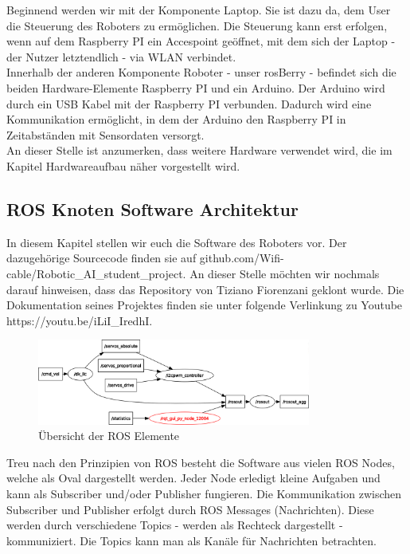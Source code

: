 \documentclass[conference]{IEEEtran}
\begin{document}
	Beginnend werden wir mit der Komponente Laptop. Sie ist dazu da, dem User die Steuerung des Roboters zu ermöglichen. Die Steuerung kann erst erfolgen, wenn auf dem Raspberry PI ein Accespoint geöffnet, mit dem sich der Laptop - der Nutzer letztendlich - via WLAN verbindet.\\
	Innerhalb der anderen Komponente Roboter - unser rosBerry - befindet sich die beiden Hardware-Elemente Raspberry PI und ein Arduino. Der Arduino wird durch ein USB Kabel mit der Raspberry PI verbunden. Dadurch wird eine Kommunikation ermöglicht, in dem der Arduino den Raspberry PI in Zeitabständen mit Sensordaten versorgt.\\
	An dieser Stelle ist anzumerken, dass weitere Hardware verwendet wird, die im Kapitel Hardwareaufbau näher vorgestellt wird.
	
	\subsection{ROS Knoten Software Architektur}%
	In diesem Kapitel stellen wir euch die Software des Roboters vor. Der dazugehörige Sourcecode finden sie auf github.com/Wifi-cable/Robotic\_AI\_student\_project. An dieser Stelle möchten wir nochmals darauf hinweisen, dass das Repository von Tiziano Fiorenzani geklont wurde. Die Dokumentation seines Projektes finden sie unter folgende Verlinkung zu Youtube https://youtu.be/iLiI\_IredhI.
	
	\begin{figure}[!ht] 
		\centering
		\includegraphics[width=9cm]{img/rosgraph.png}
		\caption{Übersicht der ROS Elemente}
		\label{rosgraph}
	\end{figure}
	
	Treu nach den Prinzipien von ROS besteht die Software aus vielen ROS Nodes, welche als Oval dargestellt werden. 
	Jeder Node erledigt kleine Aufgaben und kann als Subscriber und/oder Publisher fungieren. Die Kommunikation zwischen Subscriber und Publisher erfolgt durch ROS Messages (Nachrichten). Diese werden durch verschiedene Topics - werden als Rechteck dargestellt - kommuniziert. Die Topics kann man als Kanäle für Nachrichten betrachten.
	
\end{document}
